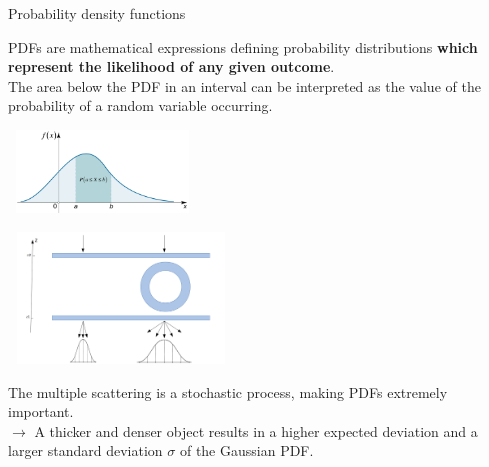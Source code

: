 \documentclass[8 pt]{beamer}
\begin{document}
\begin{frame}{Probability density functions}

\begin{minipage}[c]{.50\textwidth}
\justifying
PDFs are mathematical expressions defining probability distributions \textbf{which represent the likelihood of any given outcome}. \\ \vspace{10pt}
The area below the PDF in an interval can be interpreted as the value of the probability of a random variable occurring. 
\end{minipage}
\begin{minipage}[c]{.50\textwidth}
\begin{center}
\includegraphics[width=5cm, height=2.2cm]{figs/PDF.png}
\end{center}
\end{minipage} \vfill

\begin{minipage}[c]{.50\textwidth}
\includegraphics[width=6cm, height=3.5cm]{figs/pdfs.png}
\end{minipage}
\begin{minipage}[c]{.50\textwidth}
\justifying
The multiple scattering is a stochastic process, making PDFs extremely important. \\ \vspace{10pt} \hspace{10pt} $\rightarrow$ A thicker and denser object results in a higher expected deviation and a larger standard deviation $\sigma$ of the Gaussian PDF. 
\end{minipage}
\end{frame}
\end{document}

